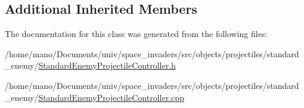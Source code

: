 \subsection*{Additional Inherited Members}


The documentation for this class was generated from the following files\+:\begin{DoxyCompactItemize}
\item 
/home/mano/\+Documents/univ/space\+\_\+invaders/src/objects/projectiles/standard\+\_\+enemy/\hyperlink{StandardEnemyProjectileController_8h}{Standard\+Enemy\+Projectile\+Controller.\+h}\item
/home/mano/\+Documents/univ/space\+\_\+invaders/src/objects/projectiles/standard\+\_\+enemy/\hyperlink{StandardEnemyProjectileController_8cpp}{Standard\+Enemy\+Projectile\+Controller.\+cpp}\end{DoxyCompactItemize}
